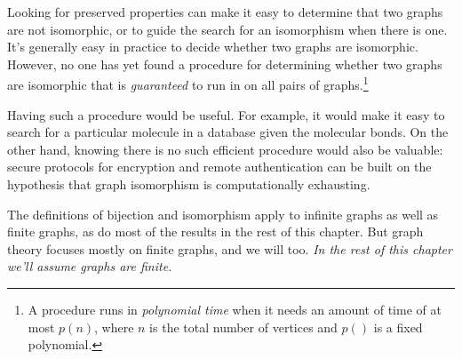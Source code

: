 Looking for preserved properties can make it easy to determine that two
graphs are not isomorphic, or to guide the search for an
isomorphism when there is one.  It's generally easy in practice to decide
whether two graphs are isomorphic.  However, no one has yet found a
procedure for determining whether two graphs are isomorphic that is
\emph{guaranteed} to run in  on all pairs of
graphs.\footnote{A procedure runs in \emph{polynomial
    time} when it needs an amount of time of at most $p(n)$, where $n$ is
  the total number of vertices and $p()$ is a fixed polynomial.}

Having such a procedure would be useful.  For example, it would make it
easy to search for a particular molecule in a database given the molecular
bonds.  On the other hand, knowing there is no such efficient procedure
would also be valuable: secure protocols for encryption and remote
authentication can be built on the hypothesis that graph isomorphism is
computationally exhausting.

\iffalse

An isomorphism between the two graphs shown in
Figure~\ref{fig:isomorphism} is easy to read off:
\[
\begin{array}{lll}
a \text{ corresponds to } 1 & \hspace{0.5in} & b \text{ corresponds to } 2 \\
d \text{ corresponds to } 4 & & c \text{ corresponds to } 3.
\end{array}
\]

To see why this works, look at any edge in the first graph, say
$\edge{b}{c}$, and make sure that the vertices corresponding to $b$ and
$c$ are the endpoints of an edge in the second graph.  Namely, verify that
$\edge{2}{3}$ is an edge of the second graph; and it is.  Conversely, look
at any edge in the second graph, say $\edge{3}{4}$, and verify that the
corresponding vertices are the endpoints of an edge of the first
graph. Namely, verify that $\edge{c}{d}$ is an edge of the first graph;
and it is.  It's a good practice exercise to verify that every edge in
either of these graphs exactly corresponds in this way to an edge in the
other graph.
\fi

The definitions of bijection and isomorphism apply to infinite graphs
as well as finite graphs, as do most of the results in the rest of
this chapter.  But graph theory focuses mostly on finite graphs, and
we will too.  \emph{In the rest of this chapter we'll assume graphs
  are finite.}

